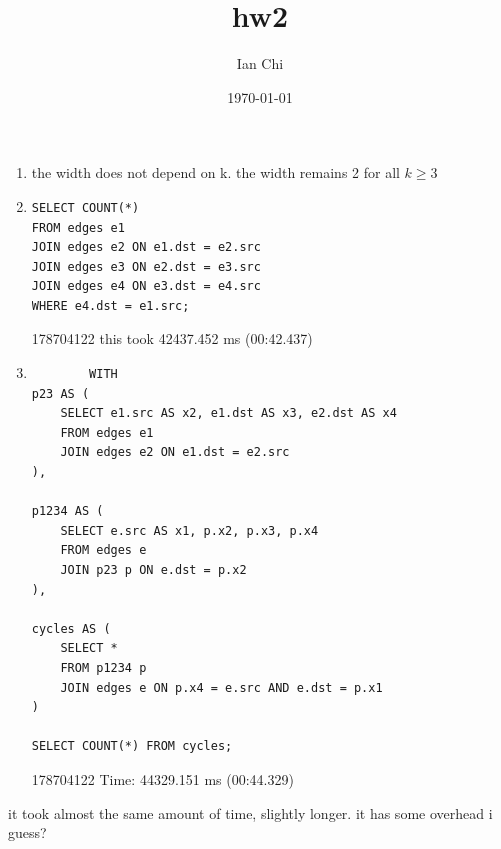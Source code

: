 \documentclass{article}
\title{hw2}
\author{Ian Chi}
\date{\today}
\begin{document}
\maketitle
\section{}




\newpage
\section{}
\begin{enumerate}
    \item the width does not depend on k. the width remains 2 for all \(k\geq 3\)
    \item 
    \begin{verbatim}
SELECT COUNT(*)
FROM edges e1
JOIN edges e2 ON e1.dst = e2.src
JOIN edges e3 ON e2.dst = e3.src
JOIN edges e4 ON e3.dst = e4.src
WHERE e4.dst = e1.src;
    \end{verbatim}
    178704122
    this took 42437.452 ms (00:42.437)
    \item 
    \begin{verbatim}
        WITH
p23 AS (
    SELECT e1.src AS x2, e1.dst AS x3, e2.dst AS x4
    FROM edges e1
    JOIN edges e2 ON e1.dst = e2.src
),

p1234 AS (
    SELECT e.src AS x1, p.x2, p.x3, p.x4
    FROM edges e
    JOIN p23 p ON e.dst = p.x2
),

cycles AS (
    SELECT *
    FROM p1234 p
    JOIN edges e ON p.x4 = e.src AND e.dst = p.x1
)

SELECT COUNT(*) FROM cycles;
    \end{verbatim}
     178704122
    Time: 44329.151 ms (00:44.329)

\end{enumerate}

it took almost the same amount of time, slightly longer. it has some overhead i guess?
\end{document}
